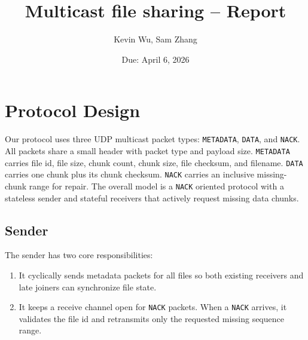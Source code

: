 \documentclass{article}
\title{Multicast file sharing -- Report}
\author{Kevin Wu, Sam Zhang}
\date{Due: April 6, 2026}
\begin{document}
\maketitle

\setlength{\parindent}{0ex} 
\setlength{\parskip}{5pt} %

%
%

\section*{Protocol Design}

Our protocol uses three UDP multicast packet types: \texttt{METADATA}, \texttt{DATA}, and \texttt{NACK}. All packets share a small header with packet type and payload size. \texttt{METADATA} carries file id, file size, chunk count, chunk size, file checksum, and filename. \texttt{DATA} carries one chunk plus its chunk checksum. \texttt{NACK} carries an inclusive missing-chunk range for repair. The overall model is a \texttt{NACK} oriented protocol with a stateless sender and stateful receivers that actively request missing data chunks.


\subsection*{Sender}

The sender has two core responsibilities:

\begin{enumerate}
	\item It cyclically sends metadata packets for all files so both existing receivers and late joiners can synchronize file state.

	\item It keeps a receive channel open for \texttt{NACK} packets. When a \texttt{NACK} arrives, it validates the file id and retransmits only the requested missing sequence range.
\end{enumerate}
\end{document}
